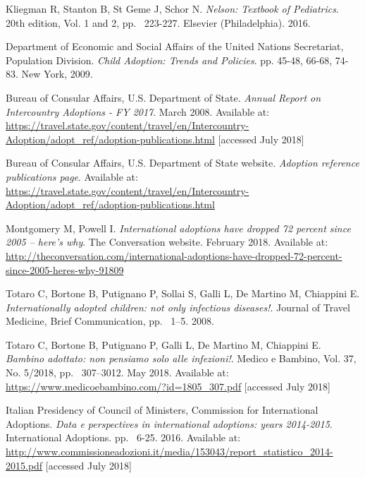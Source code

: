 
\begin{thebibliography}{50}

  Kliegman R, Stanton B, St Geme J, Schor N.
  \textit{Nelson: Textbook of Pediatrics}.
  20th edition, Vol. 1 and 2,
  pp. ~223-227.
  Elsevier (Philadelphia).
  2016.
  
  Department of Economic and Social Affairs of the United Nations Secretariat, Population Division.
  \textit{Child Adoption: Trends and Policies}.
  pp. 45-48, 66-68, 74-83.
  New York,
  2009.

  Bureau of Consular Affairs, U.S. Department of State.
  \textit{Annual Report on Intercountry Adoptions - FY 2017}.
  March 2008.
  Available at: \url{https://travel.state.gov/content/travel/en/Intercountry-Adoption/adopt_ref/adoption-publications.html} [accessed July 2018]
  
  Bureau of Consular Affairs, U.S. Department of State website.
  \textit{Adoption reference publications page}.
  Available at: \url{https://travel.state.gov/content/travel/en/Intercountry-Adoption/adopt_ref/adoption-publications.html}

  Montgomery M, Powell I.
  \textit{International adoptions have dropped 72 percent since 2005 – here’s why}.
  The Conversation website.
  February 2018.
  Available at: \url{http://theconversation.com/international-adoptions-have-dropped-72-percent-since-2005-heres-why-91809}
  
  Totaro C, Bortone B, Putignano P, Sollai S, Galli L, De Martino M, Chiappini E.
  \textit{Internationally adopted children: not only infectious diseases!}.
  Journal of Travel Medicine,
  Brief Communication,
  pp. ~1–5.
  2008.
  
  Totaro C, Bortone B, Putignano P, Galli L, De Martino M, Chiappini E.
  \textit{Bambino adottato: non pensiamo solo alle infezioni!}.
  Medico e Bambino, Vol. 37, No. 5/2018,
  pp. ~307–3012.
  May 2018.
  Available at: \url{https://www.medicoebambino.com/?id=1805_307.pdf} [accessed July 2018]
  
  Italian Presidency of Council of Ministers, Commission for International Adoptions.
  \textit{Data e perspectives in international adoptions: years 2014-2015}.
  International Adoptions.
  pp. ~6-25.
  2016.
  Available at: \url{http://www.commissioneadozioni.it/media/153043/report_statistico_2014-2015.pdf} [accessed July 2018]  
  

\end{thebibliography}
